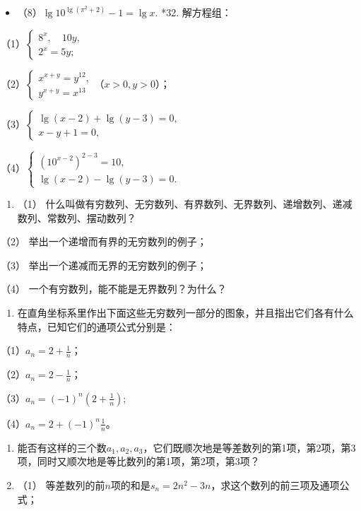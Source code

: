 \begin{itemize}
\item
  （8）\(\lg 10^{\lg (\pi^2 + 2)} - 1 = \lg x.\) *32. 解方程组：
\end{itemize}

（1）\(\left\{ \begin{array}{l} 8^{x}, \quad 10y, \\ 2^{x} = 5y; \end{array} \right.\)

（2）\(\left\{ \begin{array}{l} x^{x + y} = y^{12}, \\ y^{x + y} = x^{13} \end{array} \right.\)（\(x > 0, y > 0\)）；

（3）\(\left\{ \begin{array}{l} \lg (x - 2) + \lg (y - 3) = 0, \\ x - y + 1 = 0, \end{array} \right.\)

（4）\(\left\{ \begin{array}{l} (10^{x - 2})^{2 - 3} = 10, \\ \lg (x - 2) - \lg (y - 3) = 0. \end{array} \right.\)

\begin{enumerate}[start=33]
\item
  （1）
  什么叫做有穷数列、无穷数列、有界数列、无界数列、递增数列、递减数列、常数列、摆动数列？
\end{enumerate}

（2） 举出一个递增而有界的无穷数列的例子；

（3） 举出一个递减而无界的无穷数列的例子；

（4） 一个有穷数列，能不能是无界数列？为什么？

\begin{enumerate}[start=34]
\item
  在直角坐标系里作出下面这些无穷数列一部分的图象，并且指出它们各有什么特点，已知它们的通项公式分别是：
\end{enumerate}

（1）\(a_n=2+\frac{1}{n}\)；

（2）\(a_{n} = 2 - \frac{1}{n}\)；

（3）\(a_{n} = (-1)^{n}\left(2 + \frac{1}{n}\right);\)

（4）\(a_{n} = 2 + (-1)^{n}\frac{1}{n}\)。

\begin{enumerate}[start=35]
\item
  能否有这样的三个数\(a_1, a_2, a_3\)，它们既顺次地是等差数列的第1项，第2项，第3项，同时又顺次地是等比数列的第1项，第2项，第3项？
\item
  （1）
  等差数列的前\(n\)项的和是\(s_n = 2n^2 - 3n\)，求这个数列的前三项及通项公式；
\end{enumerate}

